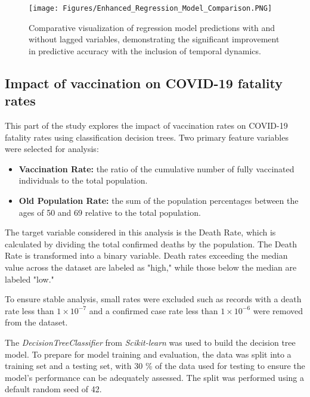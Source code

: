 \documentclass[sigconf,screen,nonacm]{acmart}
\begin{document}
\begin{figure}[H]
  \centering
  \texttt{[image: Figures/Enhanced\_Regression\_Model\_Comparison.PNG]}
  \caption{Comparative visualization of regression model predictions with and without lagged variables, demonstrating the significant improvement in predictive accuracy with the inclusion of temporal dynamics.}
  \label{fig:regression_model_comparison}
\end{figure}





\subsection{Impact of vaccination on COVID-19 fatality rates} \label{vaccines}

This part of the study explores the impact of vaccination rates on COVID-19 fatality rates using classification decision trees. Two primary feature variables were selected for analysis:

\begin{itemize}
\item \textbf{Vaccination Rate:} the ratio of the cumulative number of fully vaccinated individuals to the total population.
\item \textbf{Old Population Rate:} the sum of the population percentages between the ages of 50 and 69 relative to the total population.
\end{itemize}

The target variable considered in this analysis is the Death Rate, which is calculated by dividing the total confirmed deaths by the population. The Death Rate is transformed into a binary variable. Death rates exceeding the median value across the dataset are labeled as "high," while those below the median are labeled "low."

To ensure stable analysis, small rates were excluded such as records with a death rate less than $1 \times 10^{-7}$ and a confirmed case rate less than $1 \times 10^{-6}$ were removed from the dataset.


The \textit{DecisionTreeClassifier} from \textit{Scikit-learn} was used to build the decision tree model. To prepare for model training and evaluation, the data was split into a training set and a testing set, with 30 \% of the data used for testing to ensure the model's performance can be adequately assessed. The split was performed using a default random seed of 42.
\end{document}
